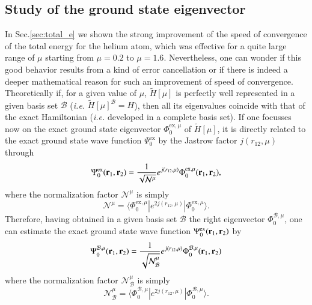 \documentclass[aip,jcp,reprint,noshowkeys,superscriptaddress]{revtex4-1}
\newcommand{\matelem}[3]{\langle #1 | #2 | #3 \rangle}
\newcommand{\br}[0]{{\bf {r}}}
\newcommand{\psiex}[0]{\Psi^{\text{ex}}_0}
\newcommand{\phimu}[0]{\Phi^{\text{ex},\mu}_0}
\newcommand{\phimub}[0]{\Phi^{\mathcal{B},\mu}_0}
\newcommand{\psimub}[0]{\Psi^{\mathcal{B},\mu}_0}
\newcommand{\basis}[0]{\mathcal{B}}
\begin{document}
\subsection{Study of the ground state eigenvector}
In Sec.\ref{sec:total_e} we shown the strong improvement of the speed of convergence of the total energy for the helium atom, which was effective for a quite large range of $\mu$ starting from $\mu=0.2$ to $\mu=1.6$. 
Nevertheless, one can wonder if this good behavior results from a kind of error cancellation or if there is indeed a deeper mathematical reason for such an improvement of speed of convergence. 
Theoretically if, for a given value of $\mu$, $\tilde{H}[\mu]$ is perfectly well represented in a given basis set $\mathcal{B}$ (\textit{i.e.} $\tilde{H}[\mu]^{\basis} = H$), then all its eigenvalues coincide with that of the exact Hamiltonian (\textit{i.e.} developed in a complete basis set). If one focusses now on the exact ground state eigenvector $\phimu$ of $\tilde{H}[\mu]$, it is directly related to the exact ground state wave function $\psiex$ by the Jastrow factor $j(r_{12},\mu)$ through 
\begin{equation}
 \psiex(\br{}_1,\br{}_2) =  \frac{1}{\sqrt{\mathcal{N}^{\mu}}} e^{j(r_{12},\mu)} \phimu(\br{}_1,\br{}_2), 
\end{equation}
where the normalization factor $\mathcal{N}^{\mu}$ is simply 
\begin{equation}
  \mathcal{N}^{\mu} = \matelem{\phimu}{e^{2 j(r_{12},\mu)}}{\phimu}.
\end{equation}
Therefore, having obtained in a given basis set $\basis$ the right eigenvector $\phimub$, one can estimate the exact ground state wave function $\psiex(\br{}_1,\br{}_2)$ by 
\begin{equation}
 \psimub(\br{}_1,\br{}_2) = \frac{1}{\sqrt{\mathcal{N}_{\basis}^{\mu}}}e^{j(r_{12},\mu)}\phimub(\br{}_1,\br{}_2)
\end{equation}
where the normalization factor $\mathcal{N}_{\basis}^{\mu}$ is simply
\begin{equation}
  \mathcal{N}_{\basis}^{\mu} = \matelem{\phimub}{e^{2 j(r_{12},\mu)}}{\phimub}.
\end{equation}
\end{document}

